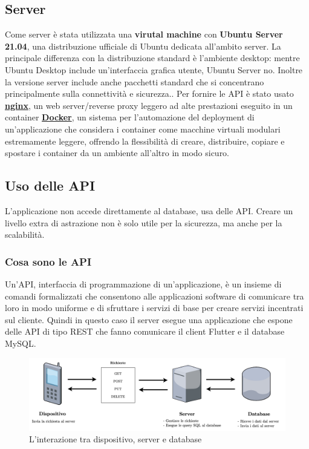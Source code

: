 \subsection{Server}
Come server è stata utilizzata una \textbf{virutal machine} con \textbf{Ubuntu Server 21.04}, una distribuzione ufficiale di Ubuntu dedicata all'ambito server. La principale differenza con la distribuzione standard è l'ambiente desktop: mentre Ubuntu Desktop include un'interfaccia grafica utente, Ubuntu Server no. Inoltre la versione server include anche pacchetti standard che si concentrano principalmente sulla connettività e sicurezza.\cite{ubuntu_server_guide}. Per fornire le API è stato usato \textbf{\href{https://www.nginx.com/}{nginx}}, un web server/reverse proxy leggero ad alte prestazioni eseguito in un container \textbf{\href{https://www.docker.com/}{Docker}}, un sistema per l'automazione del deployment di un'applicazione che considera i container come macchine virtuali modulari estremamente leggere, offrendo la flessibilità di creare, distribuire, copiare e spostare i container da un ambiente all'altro in modo sicuro.\cite{docker_guide}
\subsection{Uso delle API}
L'applicazione non accede direttamente al database, usa delle API. Creare un livello extra di astrazione non è solo utile per la sicurezza, ma anche per la scalabilità. 
\subsubsection{Cosa sono le API}
Un'API, interfaccia di programmazione di un’applicazione, è un insieme di comandi formalizzati che consentono alle applicazioni software di comunicare tra loro in modo uniforme e di sfruttare i servizi di base per creare servizi incentrati sul cliente. Quindi in questo caso il server esegue una applicazione che espone delle API di tipo REST che fanno comunicare il client Flutter e il database MySQL. 

\begin{center}
\begin{figure}[htp]
    \centering
    \includegraphics[width=12cm]{diagrams/diagramma_backend.png}
    \caption{L'interazione tra dispositivo, server e database}
    \label{fig:interazione_backend}
\end{figure}
\end{center}


